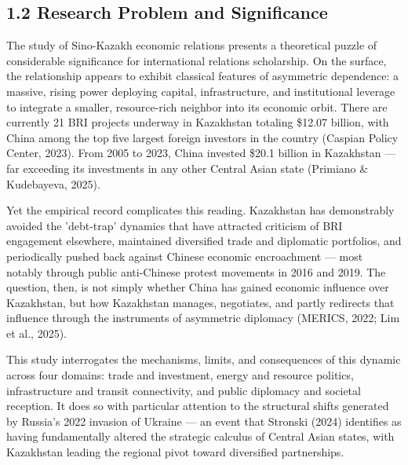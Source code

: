\documentclass[12pt]{article}
\begin{document}
\subsection{1.2 Research Problem and Significance}
The study of Sino-Kazakh economic relations presents a theoretical puzzle of considerable significance for international relations scholarship. On the surface, the relationship appears to exhibit classical features of asymmetric dependence: a massive, rising power deploying capital, infrastructure, and institutional leverage to integrate a smaller, resource-rich neighbor into its economic orbit. There are currently 21 BRI projects underway in Kazakhstan totaling \$12.07 billion, with China among the top five largest foreign investors in the country (Caspian Policy Center, 2023). From 2005 to 2023, China invested \$20.1 billion in Kazakhstan --- far exceeding its investments in any other Central Asian state (Primiano \& Kudebayeva, 2025).\par
Yet the empirical record complicates this reading. Kazakhstan has demonstrably avoided the 'debt-trap' dynamics that have attracted criticism of BRI engagement elsewhere, maintained diversified trade and diplomatic portfolios, and periodically pushed back against Chinese economic encroachment --- most notably through public anti-Chinese protest movements in 2016 and 2019. The question, then, is not simply whether China has gained economic influence over Kazakhstan, but how Kazakhstan manages, negotiates, and partly redirects that influence through the instruments of asymmetric diplomacy (MERICS, 2022; Lim et al., 2025).\par
This study interrogates the mechanisms, limits, and consequences of this dynamic across four domains: trade and investment, energy and resource politics, infrastructure and transit connectivity, and public diplomacy and societal reception. It does so with particular attention to the structural shifts generated by Russia's 2022 invasion of Ukraine --- an event that Stronski (2024) identifies as having fundamentally altered the strategic calculus of Central Asian states, with Kazakhstan leading the regional pivot toward diversified partnerships.\par
\end{document}
